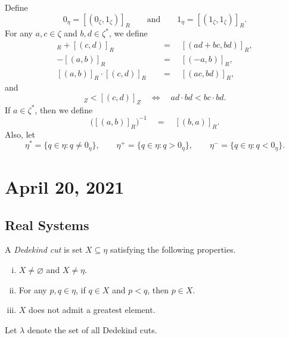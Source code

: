 \documentclass[11pt]{article}
\begin{document}
\begin{definition}
  Define
  \begin{equation*}
    0_\eta = [(0_\zeta, 1_\zeta)]_R \qquad \text{and} \qquad 1_\eta = [(1_\zeta, 1_\zeta)]_R.
  \end{equation*}
  For any $a, c \in \zeta$ and $b, d \in \zeta^*$, we define
  \begin{align*}
    [(a, b)]_R + [(c, d)]_R \quad &= \quad [(ad + bc, bd)]_R, \\
    -[(a, b)]_R \quad &= \quad [(-a, b)]_R, \\
    [(a, b)]_R \cdot [(c, d)]_R \quad &= \quad [(ac, bd)]_R,
  \end{align*}
  and
  \begin{equation*}
    [(a, b)]_Z < [(c, d)]_Z \quad \iff \quad ad \cdot bd < bc \cdot bd.
  \end{equation*}
  If $a \in \zeta^*$, then we define
  \begin{equation*}
    \bigl([(a, b)]_R\bigr)^{-1} \quad = \quad [(b, a)]_R.
  \end{equation*}
  Also, let
  \begin{equation*}
    \eta^* = \{q \in \eta: q \neq 0_\eta\}, \qquad
    \eta^+ = \{q \in \eta: q > 0_\eta\}, \qquad
    \eta^- = \{q \in \eta: q < 0_\eta\}.
  \end{equation*}
\end{definition}

\section{April 20, 2021}
\subsection{Real Systems}
\begin{definition}
  A \emph{Dedekind cut} is set $X \subseteq \eta$ satisfying the following properties.
  \begin{enumerate}[(i)]
    \item $X \neq \varnothing$ and $X \neq \eta$.
    \item For any $p, q \in \eta$, if $q \in X$ and $p < q$, then $p \in X$.
    \item $X$ does not admit a greatest element.
  \end{enumerate}
  Let $\lambda$ denote the set of all Dedekind cuts.
\end{definition}
\end{document}
